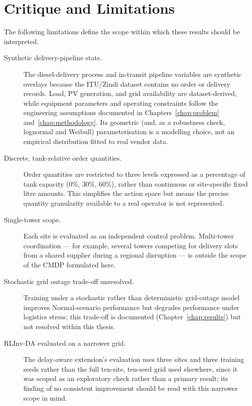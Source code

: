 \section{Critique and Limitations}
\label{sec:conclusion_limitations}

The following limitations define the scope within which these results
should be interpreted.

\begin{description}

  \item[Synthetic delivery-pipeline state.] The diesel-delivery process
  and in-transit pipeline variables are synthetic overlays because the
  ITU/Zindi dataset contains no order or delivery records. Load, PV
  generation, and grid availability are dataset-derived, while
  equipment parameters and operating constraints follow the
  engineering assumptions documented in Chapters~\ref{chap:problem}
  and~\ref{chap:methodology}.
  Its geometric (and, as a robustness check, lognormal and Weibull)
  parameterisation is a modelling choice, not an empirical distribution
  fitted to real vendor data.

  \item[Discrete, tank-relative order quantities.] Order quantities are
  restricted to three levels expressed as a percentage of tank capacity
  (0\%, 30\%, 60\%), rather than continuous or site-specific fixed
  litre amounts. This simplifies the action space but means the
  precise quantity granularity available to a real operator is not
  represented.

  \item[Single-tower scope.] Each site is evaluated as an independent
  control problem. Multi-tower coordination --- for example, several
  towers competing for delivery slots from a shared supplier during a
  regional disruption --- is outside the scope of the CMDP formulated
  here.

  \item[Stochastic grid outage trade-off unresolved.] Training under a
  stochastic rather than deterministic grid-outage model improves
  Normal-scenario performance but degrades performance under logistics
  stress; this trade-off is documented (Chapter~\ref{chap:results}) but
  not resolved within this thesis.

  \item[RLInv-DA evaluated on a narrower grid.] The delay-aware
  extension's evaluation uses three sites and three training seeds
  rather than the full ten-site, ten-seed grid used elsewhere, since it
  was scoped as an exploratory check rather than a primary result; its
  finding of no consistent improvement should be read with this narrower scope in mind.


\end{description}
